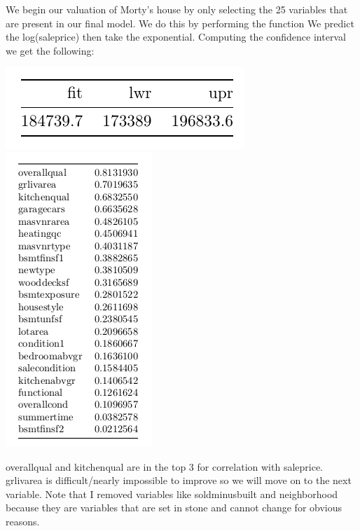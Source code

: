 \documentclass[12pt]{article}
\begin{document}
\begin{flushleft}
\begin{flushleft}
\begin{flushleft}

We begin our valuation of Morty's house by only selecting the 25 variables that are present in our final model. We do this by performing the function We predict the log(saleprice) then take the exponential. Computing the confidence interval we get the following: 

\centering
    \vspace*{0.5 cm}
    \includegraphics[scale = 0.5]{confint.png}\\[1.0 cm]	

\centering
    \vspace*{0.5 cm}
    \includegraphics[scale = 0.5]{cor.png}\\[1.0 cm]	
    
\begin{flushleft}
overallqual and kitchenqual are in the top 3 for correlation with saleprice. grlivarea is difficult/nearly impossible to improve so we will move on to the next variable. Note that I removed variables like soldminusbuilt and neighborhood because they are variables that are set in stone and cannot change for obvious reasons.


\end{flushleft}
\end{flushleft}
\end{flushleft}
\end{flushleft}
\end{document}
